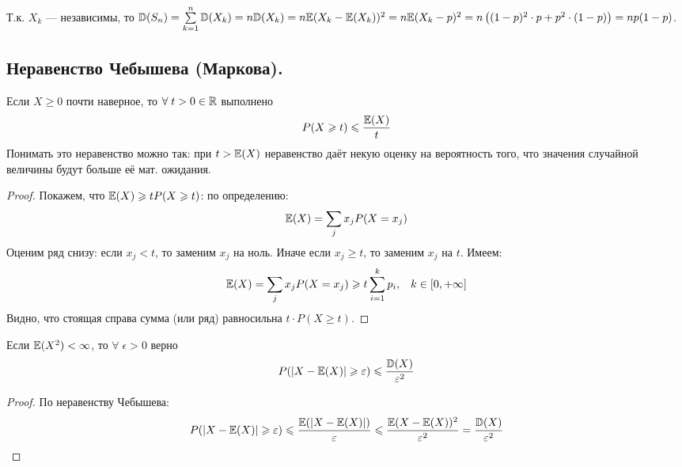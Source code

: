 Т.к. $X_k$ --- независимы, то $\mathbb{D}(S_n) = \sum\limits_{k = 1}^n \mathbb{D}(X_k) = n\mathbb{D}(X_k) =
n\mathbb{E}(X_k - \mathbb{E}(X_k))^2 = n\mathbb{E}(X_k - p)^2 = n\left( (1-p)^2 \cdot p + p^2 \cdot (1 - p) \right) = np(1 - p)$.

\subsection{Неравенство Чебышева (Маркова).}
\begin{theorem}
    Если $X \geq 0$ почти наверное, то $\forall\; t > 0 \in \mathbb{R}$ выполнено
    \[
        P(X \geqslant t) \leqslant \frac{\mathbb{E}(X)}{t}
    \]
    Понимать это неравенство можно так: при $t > \mathbb{E}(X)$ неравенство даёт некую оценку на вероятность того,
    что значения случайной величины будут больше её мат. ожидания.
\end{theorem}
\begin{proof}
    Покажем, что $\mathbb{E}(X) \geqslant tP(X \geqslant t)$: по определению:
    \[
        \mathbb{E}(X) = \sum\limits_{j} x_j P(X = x_j)
    \]
    Оценим ряд снизу: если $x_j < t$, то заменим $x_j$ на ноль. Иначе если $x_j \geq t$, то заменим
    $x_j$ на $t$. Имеем:
    \[
        \mathbb{E}(X) = \sum\limits_{j} x_j P(X = x_j) \geqslant t\sum\limits_{i = 1}^{k}p_i, \;\;\; k \in [0, +\infty]
    \]
    Видно, что стоящая справа сумма (или ряд) равносильна $t \cdot P(X \geq t)$.
\end{proof}
\begin{corollary}
    \label{ChebyshevCorollary}
    Если $\mathbb{E}(X^2) < \infty$, то $\forall\; \epsilon > 0$ верно
    \[
        P(|X - \mathbb{E}(X)| \geqslant \varepsilon) \leqslant \frac{\mathbb{D}(X)}{\varepsilon^2}
    \]
\end{corollary}
\begin{proof}
    По неравенству Чебышева:
    \[
        P(|X - \mathbb{E}(X)| \geqslant \varepsilon) \leqslant \frac{\mathbb{E}(|X - \mathbb{E}(X)|)}{\varepsilon} \leqslant \frac{\mathbb{E}(X - \mathbb{E}(X))^2}{\varepsilon^2}
        = \frac{\mathbb{D}(X)}{\varepsilon^2}
    \]
\end{proof}